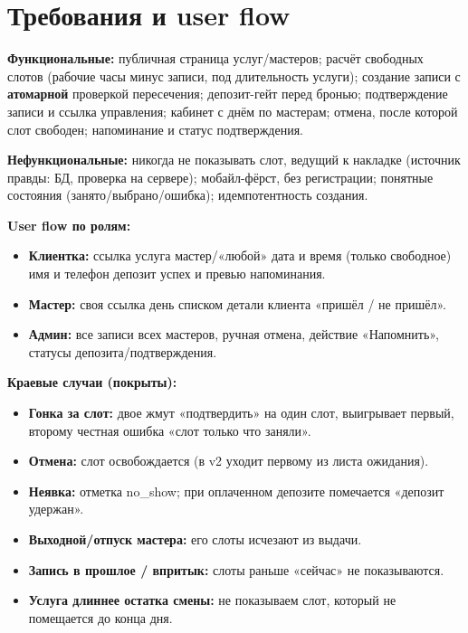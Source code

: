 \documentclass[11pt,a4paper]{article}
\newcommand{\arr}{\textrightarrow{}}
\begin{document}
\section{Требования и user flow}

\textbf{Функциональные:} публичная страница услуг/мастеров; расчёт свободных слотов (рабочие часы минус записи, под длительность услуги); создание записи с \textbf{атомарной} проверкой пересечения; депозит-гейт перед бронью; подтверждение записи и ссылка управления; кабинет с днём по мастерам; отмена, после которой слот свободен; напоминание и статус подтверждения.

\textbf{Нефункциональные:} никогда не показывать слот, ведущий к накладке (источник правды: БД, проверка на сервере); мобайл-фёрст, без регистрации; понятные состояния (занято/выбрано/ошибка); идемпотентность создания.

\textbf{User flow по ролям:}
\begin{itemize}
  \item \textbf{Клиентка:} ссылка \arr{} услуга \arr{} мастер/«любой» \arr{} дата и время (только свободное) \arr{} имя и телефон \arr{} депозит \arr{} успех и превью напоминания.
  \item \textbf{Мастер:} своя ссылка \arr{} день списком \arr{} детали клиента \arr{} «пришёл / не пришёл».
  \item \textbf{Админ:} все записи всех мастеров, ручная отмена, действие «Напомнить», статусы депозита/подтверждения.
\end{itemize}

\textbf{Краевые случаи (покрыты):}
\begin{itemize}
  \item \textbf{Гонка за слот:} двое жмут «подтвердить» на один слот, выигрывает первый, второму честная ошибка «слот только что заняли».
  \item \textbf{Отмена:} слот освобождается (в v2 уходит первому из листа ожидания).
  \item \textbf{Неявка:} отметка no\_show; при оплаченном депозите помечается «депозит удержан».
  \item \textbf{Выходной/отпуск мастера:} его слоты исчезают из выдачи.
  \item \textbf{Запись в прошлое / впритык:} слоты раньше «сейчас» не показываются.
  \item \textbf{Услуга длиннее остатка смены:} не показываем слот, который не помещается до конца дня.
\end{itemize}
\end{document}
